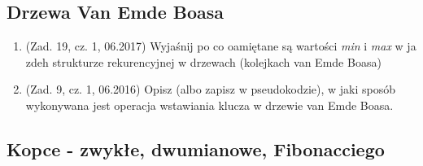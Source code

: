 \documentclass[10pt]{article}%
\begin{document}
\subsection*{Drzewa Van Emde Boasa}

\begin{enumerate}
\item (Zad. 19, cz. 1, 06.2017) Wyjaśnij po co oamiętane są wartości \emph{min} i \emph{max} w ja zdeh strukturze rekurencyjnej w drzewach (kolejkach van Emde Boasa)

\item (Zad. 9, cz. 1, 06.2016) Opisz (albo zapisz w pseudokodzie), w jaki sposób wykonywana jest operacja wstawiania klucza w drzewie van Emde Boasa.

\end{enumerate}


\subsection*{Kopce - zwykłe, dwumianowe, Fibonacciego}
\end{document}
